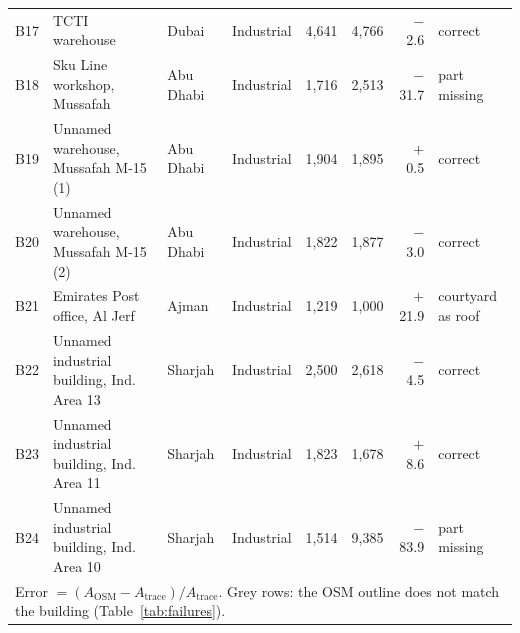 \begin{table}[t]
\begin{tabular}{llllrrrl}
B17 & TCTI warehouse & Dubai & Industrial & 4,641 & 4,766 & $-$2.6 & correct \\
\rowcolor{black!8}B18 & Sku Line workshop, Mussafah & Abu Dhabi & Industrial & 1,716 & 2,513 & $-$31.7 & part missing \\
B19 & Unnamed warehouse, Mussafah M-15 (1) & Abu Dhabi & Industrial & 1,904 & 1,895 & $+$0.5 & correct \\
B20 & Unnamed warehouse, Mussafah M-15 (2) & Abu Dhabi & Industrial & 1,822 & 1,877 & $-$3.0 & correct \\
\rowcolor{black!8}B21 & Emirates Post office, Al Jerf & Ajman & Industrial & 1,219 & 1,000 & $+$21.9 & courtyard as roof \\
B22 & Unnamed industrial building, Ind. Area 13 & Sharjah & Industrial & 2,500 & 2,618 & $-$4.5 & correct \\
B23 & Unnamed industrial building, Ind. Area 11 & Sharjah & Industrial & 1,823 & 1,678 & $+$8.6 & correct \\
\rowcolor{black!8}B24 & Unnamed industrial building, Ind. Area 10 & Sharjah & Industrial & 1,514 & 9,385 & $-$83.9 & part missing \\
\bottomrule
\multicolumn{8}{l}{Error $=(A_{\mathrm{OSM}}-A_{\mathrm{trace}})/A_{\mathrm{trace}}$. Grey rows: the OSM outline does not match the building (Table~\ref{tab:failures}).}\\
\end{tabular}
\end{table}